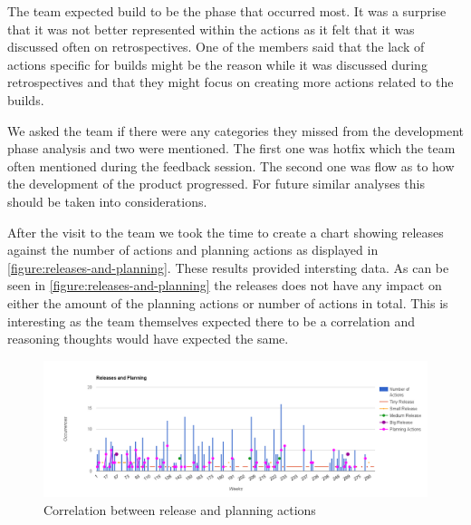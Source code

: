 The team expected build to be the phase that occurred most. It was a surprise that it was not better represented within the actions as it felt that it was discussed often on retrospectives. One of the members said that the lack of actions specific for builds might be the reason while it was discussed during retrospectives and that they might focus on creating more actions related to the builds. 

We asked the team if there were any categories they missed from the development phase analysis and two were mentioned. The first one was hotfix which the team often mentioned during the feedback session. The second one was flow as to how the development of the product progressed. For future similar analyses this should be taken into considerations. 

After the visit to the team we took the time to create a chart showing releases against the number of actions and planning actions as displayed in \autoref{figure:releases-and-planning}. These results provided intersting data. As can be seen in \autoref{figure:releases-and-planning} the releases does not have any impact on either the amount of the planning actions or number of actions in total. This is interesting as the team themselves expected there to be a correlation and reasoning thoughts would have expected the same. 

\begin{figure}
	\centering
	\includegraphics[width=\textwidth, keepaspectratio]{figures/releases-and-planning.png}
	\caption{Correlation between release and planning actions}
	\label{figure:releases-and-planning}
\end{figure}

